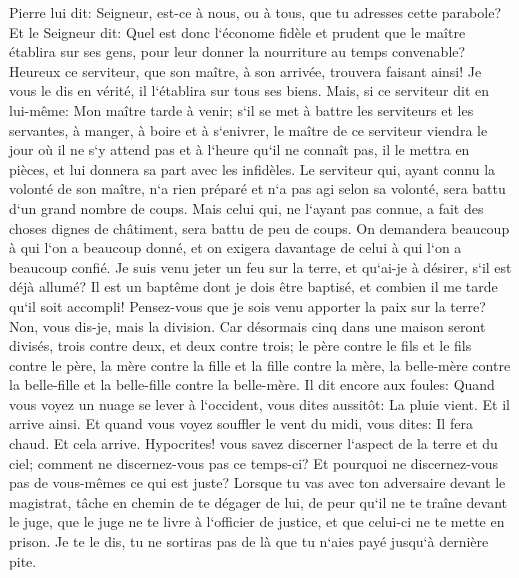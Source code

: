\verse Pierre lui dit: Seigneur, est-ce à nous, ou à tous, que tu adresses cette parabole? 
\verse Et le Seigneur dit: Quel est donc l`économe fidèle et prudent que le maître établira sur ses gens, pour leur donner la nourriture au temps convenable? 
\verse Heureux ce serviteur, que son maître, à son arrivée, trouvera faisant ainsi! 
\verse Je vous le dis en vérité, il l`établira sur tous ses biens. 
\verse Mais, si ce serviteur dit en lui-même: Mon maître tarde à venir; s`il se met à battre les serviteurs et les servantes, à manger, à boire et à s`enivrer, 
\verse le maître de ce serviteur viendra le jour où il ne s`y attend pas et à l`heure qu`il ne connaît pas, il le mettra en pièces, et lui donnera sa part avec les infidèles. 
\verse Le serviteur qui, ayant connu la volonté de son maître, n`a rien préparé et n`a pas agi selon sa volonté, sera battu d`un grand nombre de coups. 
\verse Mais celui qui, ne l`ayant pas connue, a fait des choses dignes de châtiment, sera battu de peu de coups. On demandera beaucoup à qui l`on a beaucoup donné, et on exigera davantage de celui à qui l`on a beaucoup confié. 
\verse Je suis venu jeter un feu sur la terre, et qu`ai-je à désirer, s`il est déjà allumé? 
\verse Il est un baptême dont je dois être baptisé, et combien il me tarde qu`il soit accompli! 
\verse Pensez-vous que je sois venu apporter la paix sur la terre? Non, vous dis-je, mais la division. 
\verse Car désormais cinq dans une maison seront divisés, trois contre deux, et deux contre trois; 
\verse le père contre le fils et le fils contre le père, la mère contre la fille et la fille contre la mère, la belle-mère contre la belle-fille et la belle-fille contre la belle-mère. 
\verse Il dit encore aux foules: Quand vous voyez un nuage se lever à l`occident, vous dites aussitôt: La pluie vient. Et il arrive ainsi. 
\verse Et quand vous voyez souffler le vent du midi, vous dites: Il fera chaud. Et cela arrive. 
\verse Hypocrites! vous savez discerner l`aspect de la terre et du ciel; comment ne discernez-vous pas ce temps-ci? 
\verse Et pourquoi ne discernez-vous pas de vous-mêmes ce qui est juste? 
\verse Lorsque tu vas avec ton adversaire devant le magistrat, tâche en chemin de te dégager de lui, de peur qu`il ne te traîne devant le juge, que le juge ne te livre à l`officier de justice, et que celui-ci ne te mette en prison. 
\verse Je te le dis, tu ne sortiras pas de là que tu n`aies payé jusqu`à dernière pite. 

